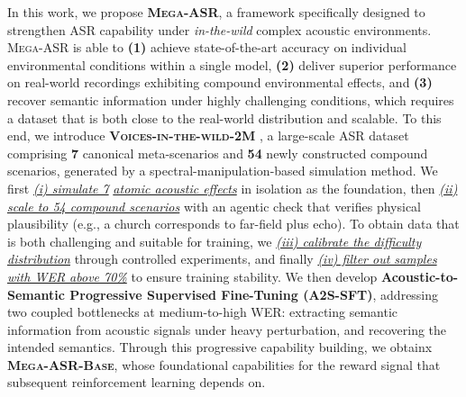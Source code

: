 \documentclass{llmxive}
\begin{document}
In this work, we propose \textbf{\textsc{Mega-ASR}}, a framework specifically designed to strengthen ASR capability under \textit{in-the-wild} complex acoustic environments. \textsc{Mega-ASR} is able to \textbf{(1)} achieve state-of-the-art accuracy on individual environmental conditions within a single model, \textbf{(2)} deliver superior performance on real-world recordings exhibiting compound environmental effects, and \textbf{(3)} recover semantic information under highly challenging conditions, which requires a dataset that is both close to the real-world distribution and scalable. To this end, we introduce \textbf{\textsc{ \textsc{Voices-in-the-wild-2M} }}, a large-scale ASR dataset comprising \textbf{7} canonical meta-scenarios and \textbf{54} newly constructed compound scenarios, generated by a spectral-manipulation-based simulation method. We first  \underline{\textit{(i) simulate 7}} \underline{\textit{atomic acoustic effects}} in isolation as the foundation, then \underline{\textit{(ii) scale to 54 compound scenarios}} with an agentic check that verifies physical plausibility (e.g., a church corresponds to far-field plus echo).  To obtain data that is both challenging and suitable for training, we \underline{\textit{(iii) calibrate the difficulty}} \underline{\textit{distribution}} through controlled experiments, and finally \underline{\textit{(iv) filter out samples with WER above 70\%}} to ensure training stability. We then develop \textbf{Acoustic-to-Semantic Progressive Supervised Fine-Tuning (A2S-SFT)}, addressing two coupled bottlenecks at medium-to-high WER: extracting semantic information from acoustic signals under heavy perturbation, and recovering the intended semantics. Through this progressive capability building, we obtainx \textbf{\textsc{Mega-ASR-Base}}, whose foundational capabilities for the reward signal that subsequent reinforcement learning depends on.
\end{document}
